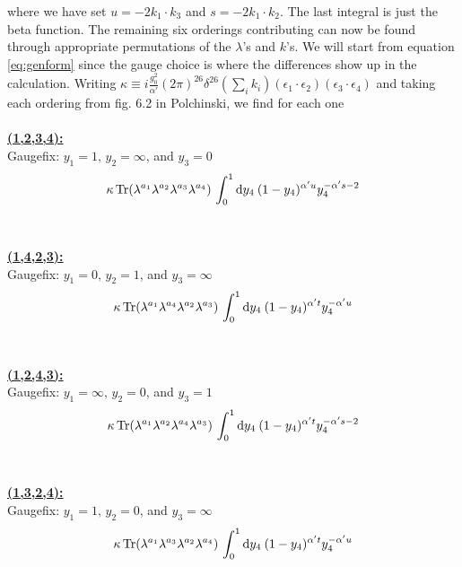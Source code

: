 \documentclass[a4paper,10pt]{article}
\renewcommand\[{\begin{equation*}}
\renewcommand\]{\end{equation*}}
\numberwithin{equation}{section}
\begin{document}
where we have set $u=-2k_1\cdot k_3$ and $s=-2k_1\cdot k_2$. The last integral is just the beta function. The remaining six orderings contributing can now be found through appropriate permutations of the $\lambda$'s and $k$'s. We will start from equation \eqref{eq:genform} since the gauge choice is where the differences show up in the calculation. Writing $\kappa\equiv i\frac{g_0^2}{\alpha'}(2\pi)^{26}\delta^{26}\left(\sum_ik_i\right)(\epsilon_{1}\cdot \epsilon_{2})(\epsilon_{3}\cdot \epsilon_{4})$ and taking each ordering from fig. 6.2 in Polchinski, we find for each one
\\\\
\underline{\textbf{(1,2,3,4):}}\\
Gaugefix: $y_1=1,\,y_2=\infty$, and $y_3=0$
\begin{equation}
\begin{aligned}
\kappa \Tr(\lambda^{a_1}\lambda^{a_2}\lambda^{a_3}\lambda^{a_4})\,\int_{0}^{1} \dd y_4\:(1-y_4)^{\alpha' u}y_{4}^{-\alpha's-2}
\end{aligned}
\end{equation}
\\\\
\underline{\textbf{(1,4,2,3):}}\\
Gaugefix: $y_1=0,\,y_2=1$, and $y_3=\infty$
\begin{equation}
	\begin{aligned}
		\kappa \Tr(\lambda^{a_1}\lambda^{a_4}\lambda^{a_2}\lambda^{a_3})\,\int_{0}^{1} \dd y_4\:(1-y_4)^{\alpha' t}y_{4}^{-\alpha'u}
	\end{aligned}
\end{equation}
\\\\
\underline{\textbf{(1,2,4,3):}}\\
Gaugefix: $y_1=\infty,\,y_2=0$, and $y_3=1$
\begin{equation}
	\begin{aligned}
		\kappa \Tr(\lambda^{a_1}\lambda^{a_2}\lambda^{a_4}\lambda^{a_3})\,\int_{0}^{1} \dd y_4\:(1-y_4)^{\alpha' t}y_{4}^{-\alpha's-2}
	\end{aligned}
\end{equation}
\\\\
\underline{\textbf{(1,3,2,4):}}\\
Gaugefix: $y_1=1,\,y_2=0$, and $y_3=\infty$
\begin{equation}
\begin{aligned}
\kappa \Tr(\lambda^{a_1}\lambda^{a_3}\lambda^{a_2}\lambda^{a_4})\,\int_{0}^{1} \dd y_4\:(1-y_4)^{\alpha' t}y_{4}^{-\alpha'u}
\end{aligned}
\end{equation}
\end{document}
